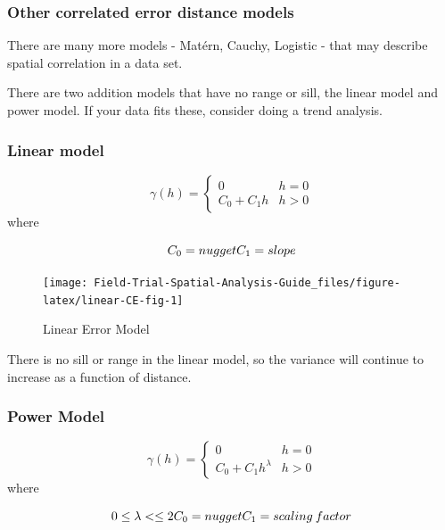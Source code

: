 \documentclass[]{book}
\begin{document}
\hypertarget{other-correlated-error-distance-models}{%
\subsubsection{Other correlated error distance models}\label{other-correlated-error-distance-models}}

There are many more models - Matérn, Cauchy, Logistic - that may describe spatial correlation in a data set.

There are two addition models that have no range or sill, the linear model and power model. If your data fits these, consider doing a trend analysis.

\hypertarget{linear-model}{%
\subsubsection{Linear model}\label{linear-model}}

\[ \gamma (h)=\left\{ {\begin{array}{cc} 0 & h = 0\\ C_0+C_1h & h > 0 \end{array} } \right. \]
where

\[ C_0 = nugget \\ C_1 = slope \]

\begin{figure}

{\centering \texttt{[image: Field-Trial-Spatial-Analysis-Guide\_files/figure-latex/linear-CE-fig-1]} 

}

\caption{Linear Error Model}\label{fig:linear-CE-fig}
\end{figure}

There is no sill or range in the linear model, so the variance will continue to increase as a function of distance.

\hypertarget{power-model}{%
\subsubsection{Power Model}\label{power-model}}

\[ \gamma (h)=\left\{ {\begin{array}{cc} 0 & h = 0\\ C_0+C_1h^\lambda & h > 0 \end{array} } \right. \]
where

\[ 0 \leq \lambda <\leq 2 \\ C_0 = nugget \\ C_1 = scaling \: factor \]
\end{document}
